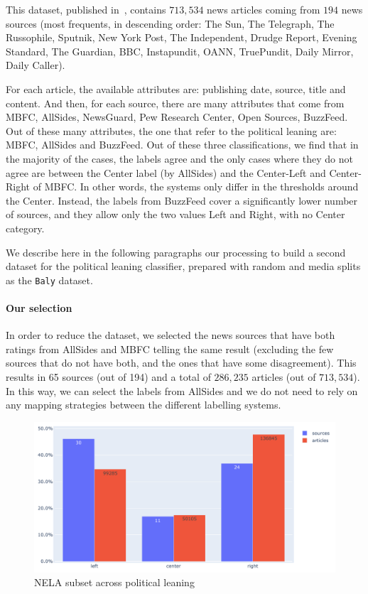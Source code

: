 This dataset, published in~\citet{DVN/ULHLCB_2019}, contains $713,534$ news articles coming from $194$ news sources (most frequents, in descending order: The Sun, The Telegraph, The Russophile, Sputnik, New York Post, The Independent, Drudge Report, Evening Standard, The Guardian, BBC, Instapundit, OANN, TruePundit, Daily Mirror, Daily Caller).

For each article, the available attributes are: publishing date, source, title and content.
And then, for each source, there are many attributes that come from MBFC, AllSides, NewsGuard, Pew Research Center, Open Sources, BuzzFeed. Out of these many attributes, the one that refer to the political leaning are: MBFC, AllSides and BuzzFeed. Out of these three classifications, we find that in the majority of the cases, the labels agree and the only cases where they do not agree are between the Center label (by AllSides) and the Center-Left and Center-Right of MBFC. In other words, the systems only differ in the thresholds around the Center.
Instead, the labels from BuzzFeed cover a significantly lower number of sources, and they allow only the two values Left and Right, with no Center category.

We describe here in the following paragraphs our processing to build a second dataset for the political leaning classifier, prepared with random and media splits as the \texttt{Baly} dataset.

\paragraph{Our selection}

In order to reduce the dataset, we selected the news sources that have both ratings from AllSides and MBFC telling the same result (excluding the few sources that do not have both, and the ones that have some disagreement).
This results in 65 sources (out of 194) and a total of $286,235$ articles (out of $713,534$).
In this way, we can select the labels from AllSides and we do not need to rely on any mapping strategies between the different labelling systems.

\begin{figure}[!htbp]
    \centering
    \includegraphics[width=\linewidth]{figures/nela_subset_allsides_simplified.pdf}
    \caption{NELA subset across political leaning}
    \label{fig:nela_subset_allsides_simplified}
\end{figure}

